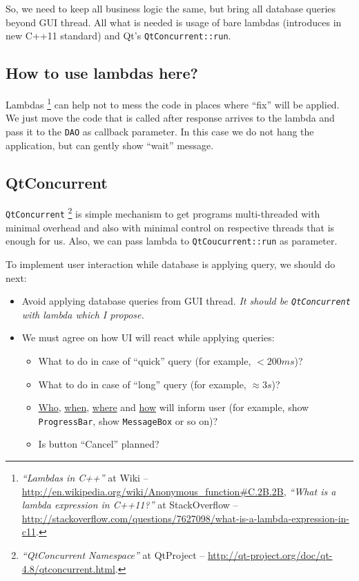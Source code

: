 \documentclass[a4paper,12pt]{scrartcl}
\begin{document}
So, we need to keep all business logic the same, but bring all database queries beyond GUI thread. All what is needed is usage of bare lambdas (introduces in new C++11 standard) and Qt's \texttt{QtConcurrent::run}.

\subsection{How to use lambdas here?}

Lambdas%
\footnote{\textit{``Lambdas in C++''} at Wiki -- 
\url{http://en.wikipedia.org/wiki/Anonymous\_function\#C.2B.2B}, 
\textit{``What is a lambda expression in C++11?''} at StackOverflow -- 
\url{http://stackoverflow.com/questions/7627098/what-is-a-lambda-expression-in-c11}.}
can help not to mess the code in places where ``fix'' will be applied. We just move the code that is called after response arrives to the lambda and pass it to the \texttt{DAO} as callback parameter. In this case we do not hang the application, but can gently show ``wait'' message. 


\subsection{QtConcurrent}
\texttt{QtConcurrent}%
\footnote{\textit{``QtConcurrent Namespace''} at QtProject -- \url{http://qt-project.org/doc/qt-4.8/qtconcurrent.html}.}
is simple mechanism to get programs multi-threaded with minimal overhead and also with minimal control on respective threads that is enough for us. Also, we can pass lambda to \texttt{QtCoucurrent::run} as parameter.

To implement user interaction while database is applying query, we should do next:
\begin{itemize}
 \item Avoid applying database queries from GUI thread. \textit{It should be \texttt{QtConcurrent} with lambda which I propose.}
 \item We must agree on how UI will react while applying queries:
 \begin{itemize}
  \item What to do in case of ``quick'' query (for example, $< 200 ms$)?
  \item What to do in case of ``long'' query (for example, $\approx 3 s$)?
  \item \underline{Who}, \underline{when}, \underline{where} and \underline{how} will inform user (for example, show \texttt{ProgressBar}, show \texttt{MessageBox} or so on)?
  \item Is button ``Cancel'' planned?
 \end{itemize}
\end{itemize}
\end{document}
